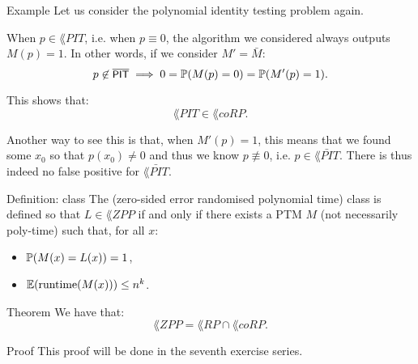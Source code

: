 \documentclass[a4paper]{article}
\begin{document}
\begin{parag}{Example}
    Let us consider the polynomial identity testing problem again.

    When $p \in \lang{PIT}$, i.e. when $p \equiv 0$, the algorithm we considered always outputs $M\left(p\right) = 1$. In other words, if we consider $M' = \bar{M}$: 
    \[p \not\in \bar{\lang{PIT}} \implies 0 = \prob\left(M\left(p\right) = 0\right) = \prob\left(M'\left(p\right) = 1\right).\]

    This shows that: 
    \[\lang{PIT} \in \lang{coRP}.\]

    Another way to see this is that, when $M'\left(p\right) = 1$, this means that we found some $x_0$ so that $p\left(x_0\right) \neq 0$ and thus we know $p \not\equiv 0$, i.e. $p \in \bar{\lang{PIT}}$. There is thus indeed no false positive for $\bar{\lang{PIT}}$.
\end{parag}

\begin{parag}{Definition:  class}
    The  (zero-sided error randomised polynomial time) class is defined so that $L \in \lang{ZPP}$ if and only if there exists a PTM $M$ (not necessarily poly-time) such that, for all $x$:
    \begin{itemize}
        \item $\prob\left(M\left(x\right) = L\left(x\right)\right) = 1$,
        \item $\exval\left(\text{runtime}\left(M\left(x\right)\right)\right) \leq n^k$.
    \end{itemize}
\end{parag}

\begin{parag}{Theorem}
    We have that:
    \[\lang{ZPP} = \lang{RP} \cap \lang{coRP}.\]

    \begin{subparag}{Proof}
        This proof will be done in the seventh exercise series.
    \end{subparag}
\end{parag}
\end{document}

